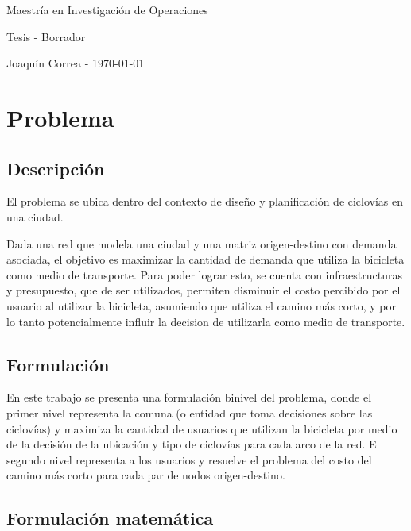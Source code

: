 \documentclass{article}
\begin{document}
  \begin{center}
    {\sc \large Maestría en Investigación de Operaciones}
    
    {\sc \large Tesis - Borrador}
    \linebreak

    {\rm Joaquín Correa - \today}
  \end{center}

  \section*{Problema}

  \subsection*{Descripción}

  El problema se ubica dentro del contexto de diseño y planificación de ciclovías en una ciudad.

  Dada una red que modela una ciudad y una matriz origen-destino con demanda asociada, el objetivo es maximizar la cantidad de demanda que utiliza la bicicleta como medio de transporte. Para poder lograr esto, se cuenta con infraestructuras y presupuesto, que de ser utilizados, permiten disminuir el costo percibido por el usuario al utilizar la bicicleta, asumiendo que utiliza el camino más corto, y por lo tanto potencialmente influir la decision de utilizarla como medio de transporte.

  \subsection*{Formulación}

  En este trabajo se presenta una formulación binivel del problema, donde el primer nivel representa la comuna (o entidad que toma decisiones sobre las ciclovías) y maximiza la cantidad de usuarios que utilizan la bicicleta por medio de la decisión de la ubicación y tipo de ciclovías para cada arco de la red. El segundo nivel representa a los usuarios y resuelve el problema del costo del camino más corto para cada par de nodos origen-destino.

  \subsection*{Formulación matemática}
\end{document}
